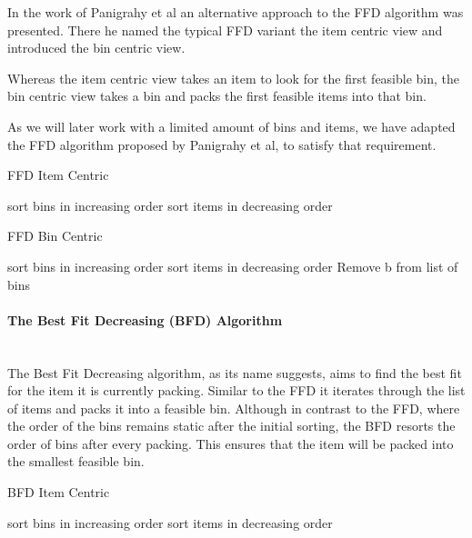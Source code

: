 \documentclass[a4paper,11pt,titlepage]{article}
\begin{document}
In the work of Panigrahy et al an alternative approach to the FFD algorithm was presented. There he named the typical FFD variant the item centric view and introduced the bin centric view.

Whereas the item centric view takes an item to look for the first feasible bin, the bin centric view takes a bin and packs the first feasible items into that bin.

As we will later work with a limited amount of bins and items, we have adapted the FFD algorithm proposed by Panigrahy et al, to satisfy that requirement.


\begin{algorithm}
	\caption{FFD Item Centric}\label{alg:two}
	
	sort bins in increasing order\;
	sort items in decreasing order\;
\end{algorithm}
	
\begin{algorithm}
	\caption{FFD Bin Centric}\label{alg:two}
	
	sort bins in increasing order\;
	sort items in decreasing order\;
		Remove b from list of bins\;	
\end{algorithm}	


\paragraph{The Best Fit Decreasing (BFD) Algorithm}
\mbox{} \\

The Best Fit Decreasing algorithm, as its name suggests, aims to find the best fit for the item it is currently packing. Similar to the FFD it iterates through the list of items and packs it into a feasible bin. Although in contrast to the FFD, where the order of the bins remains static after the initial sorting, the BFD resorts the order of bins after every packing. This ensures that the item will be packed into the smallest feasible bin. 


\begin{algorithm}
	
		\caption{BFD Item Centric}\label{alg:two}
		sort bins in increasing order\;
		sort items in decreasing order\;
\end{algorithm}
\end{document}
